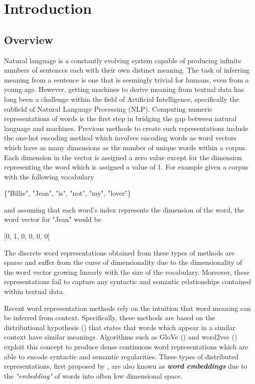 \chapter{Introduction}
\label{chap:intro}
\section{Overview}
Natural language is a constantly evolving system capable of producing infinite numbers of sentences each with their own distinct meaning. The task of inferring meaning from a sentence is one that is seemingly trivial for humans, even from a young age. However, getting machines to derive meaning from textual data has long been a challenge within the field of Artificial Intelligence, specifically the subfield of Natural Language Processing (NLP). Computing numeric representations of words is the first step in bridging the gap between natural language and machines. Previous methods to create such representations include the one-hot encoding method which involves encoding words as word vectors which have as many dimensions as the number of unique words within a corpus. Each dimension in the vector is assigned a zero value except for the dimension representing the word which is assigned a value of 1. For example given a corpus with the following vocabulary 

\begin{center}
\{"Billie", "Jean", "is", "not", "my", "lover"\}
\end{center}

\noindent
and assuming that each word's index represents the dimension of the word, the word vector for "Jean" would be 

\begin{center}
	[0, 1, 0, 0, 0, 0]
\end{center}

\noindent
\newline
The discrete word representations obtained from these types of methods are sparse and suffer from the curse of dimensionality due to the dimensionality of the word vector growing linearly with the size of the vocabulary. Moreover, these representations fail to capture any syntactic and semantic relationships contained within textual data.
 
\noindent
\newline
Recent word representation methods rely on the intuition that word meaning can be inferred from context. Specifically, these methods are based on the distributional hypothesis (\cite{Harris1954}) that states that words which appear in a similar context have similar meanings. Algorithms such as GloVe (\cite{Pennington2014}) and word2vec (\cite{Mikolov2013}) exploit this concept to produce dense continuous word representations which are able to encode syntactic and semantic regularities. These types of distributed representations, first proposed by \cite{Hinton1986},  are also known as \textit{\textbf{word embeddings}} due to the \textit{"embedding"} of words into often low dimensional space.


